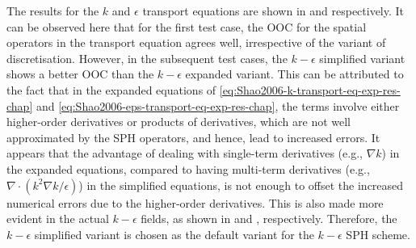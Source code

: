 The results for the $k$ and $\epsilon$ transport equations are shown in  and  respectively. It can be observed here that for the first test case, the OOC for the spatial operators in the transport equation agrees well, irrespective of the variant of discretisation.
However, in the subsequent test cases, the $k-\epsilon$ simplified variant shows a better OOC than the $k-\epsilon$ expanded variant.
This can be attributed to the fact that in the expanded equations of \eqref{eq:Shao2006-k-transport-eq-exp-res-chap} and \eqref{eq:Shao2006-eps-transport-eq-exp-res-chap}, the terms involve either higher-order derivatives or products of derivatives, which are not well approximated by the SPH operators, and hence, lead to increased errors. It appears that the advantage of dealing with single-term derivatives (e.g., $\nabla k$) in the expanded equations, compared to having multi-term derivatives (e.g., $\nabla \cdot (k^2\nabla k / \epsilon)$) in the simplified equations, is not enough to offset the increased numerical errors due to the higher-order derivatives.
This is also made more evident in the actual $k-\epsilon$ fields, as shown in  and , respectively.
Therefore, the $k-\epsilon$ simplified variant is chosen as the default variant for the $k-\epsilon$ SPH scheme.

